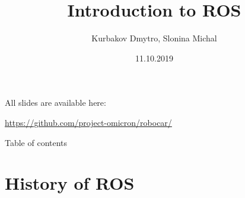\documentclass{beamer}
\begin{document}
\title{Introduction to ROS} 
\author{Kurbakov Dmytro, Slonina Michal}

\date{11.10.2019}

\begin{frame}
\titlepage
\end{frame}

\begin{frame}
All slides are available here:

\url{https://github.com/project-omicron/robocar/}
\end{frame}

\begin{frame}{Table of contents}
\tableofcontents
\end{frame}

\section{History of ROS} 
\end{document}
